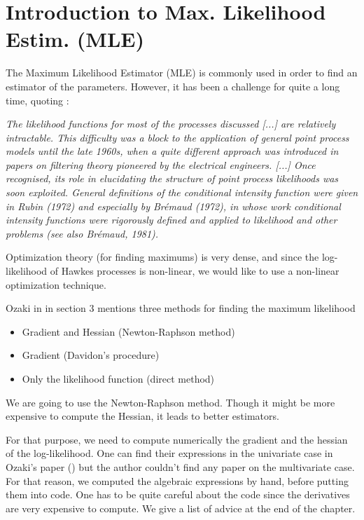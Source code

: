 \section{Introduction to Max. Likelihood Estim. (MLE)}

The Maximum Likelihood Estimator (MLE) is commonly used in order to find an estimator of the parameters. However, it has been a challenge for quite a long time, quoting \cite{daley}:

\textit{The likelihood functions for most of the processes discussed [...] are relatively intractable. This difficulty was a block to the application of general point process models until the late 1960s, when a quite different approach was introduced in papers on filtering theory pioneered by the electrical engineers. [...] Once recognised, its role in elucidating the structure of point process likelihoods was soon exploited. General definitions of the conditional intensity function were given in Rubin (1972) and especially by Brémaud (1972), in whose work conditional intensity functions were rigorously defined and applied to likelihood and other problems (see also Brémaud, 1981).}

Optimization theory (for finding maximums) is very dense, and since the log-likelihood of Hawkes processes is non-linear, we would like to use a non-linear optimization technique. 

Ozaki in \cite{Ozaki} in section 3 mentions three methods for finding the maximum likelihood

\begin{itemize}
\item Gradient and Hessian (Newton-Raphson method)
\item Gradient (Davidon's procedure)
\item Only the likelihood function (direct method)
\end{itemize}


We are going to use the Newton-Raphson method. Though it might be more expensive to compute the Hessian, it leads to better estimators.


For that purpose, we need to compute numerically the gradient and the hessian of the log-likelihood. One can find their expressions in the univariate case in Ozaki's paper (\cite{Ozaki}) but the author couldn't find any paper on the multivariate case. For that reason, we computed the algebraic expressions by hand, before putting them into code. One has to be quite careful about the code since the derivatives are very expensive to compute. We give a list of advice at the end of the chapter.





